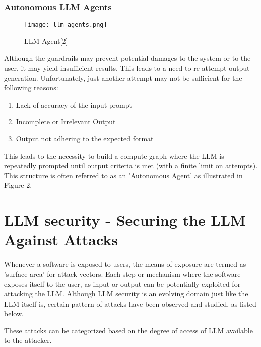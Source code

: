 \documentclass[12pt]{article}
\begin{document}
    \subsubsection{Autonomous LLM Agents}
    \begin{wrapfigure}{rb}{0.25\textwidth}
        \texttt{[image: llm-agents.png]}
        \caption{LLM Agent[2]}
        \label{fig:enter-label}
    \end{wrapfigure}

    Although the guardrails may prevent potential damages to the system or to the user, it may yield insufficient results.
    This leads to a need to re-attempt output generation. Unfortunately, just another attempt may not be sufficient for the following reasons:
    \begin{enumerate}[label=\alph*)]
        \item Lack of accuracy of the input prompt
        \item Incomplete or Irrelevant Output
        \item Output not adhering to the expected format
    \end{enumerate}
    This leads to the necessity to build a compute graph where the LLM is repeatedly prompted until output criteria is met (with a finite limit on attempts). This structure is often referred to as an \href{https://www.promptingguide.ai/research/llm-agents}{'Autonomous Agent'} as illustrated in Figure 2.


    \section{LLM security - Securing the LLM Against Attacks}
    Whenever a software is exposed to users, the means of exposure are termed as 'surface area' for attack vectors. Each step or mechanism where the software exposes itself to the user, as input or output can be potentially exploited for attacking the LLM. Although LLM security is an evolving domain just like the LLM itself is, certain pattern of attacks have been observed and studied, as listed below.

    These attacks can be categorized based on the degree of access of LLM available to the attacker.
\end{document}
